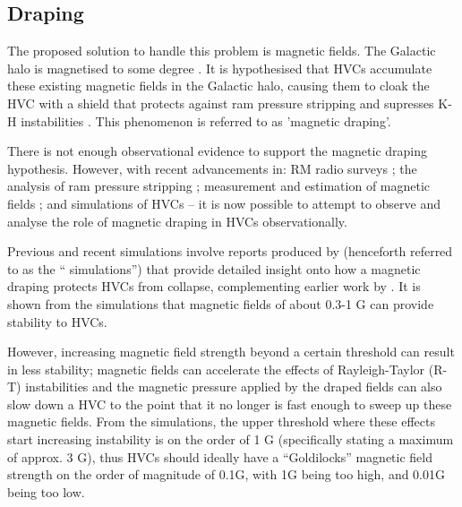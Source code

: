 \subsection{Draping}
\label{ssec:draping}

The proposed solution to handle this problem is magnetic fields. The Galactic halo is magnetised to some degree \citep{ID30, ID16, ID4, ID42}. It is hypothesised that HVCs accumulate these existing magnetic fields in the Galactic halo, causing them to cloak the HVC with a shield that protects against ram pressure stripping and supresses K-H instabilities \citep{ID10, ID11, ID13, ID23, ID24, ID34}. This phenomenon is referred to as 'magnetic draping'.


There is not enough observational evidence to support the magnetic draping hypothesis. However, with recent advancements in: RM radio surveys \citep{ID52, ID71, ID1, ID3, ID6, ID18, ID43, ID44, ID45}; the analysis of ram pressure stripping \citep{ID11, ID23, ID33}; measurement and estimation of magnetic fields \citep{ID5, ID23, ID30, ID11, ID26, ID21}; and simulations of HVCs \citep{ID13, ID23, ID24, ID33, ID34} – it is now possible to attempt to observe and analyse the role of magnetic draping in HVCs observationally.


Previous and recent simulations involve reports produced by \cite{ID23, ID24, ID33} (henceforth referred to as the “\citeauthor{ID23} simulations”) that provide detailed insight onto how a magnetic draping protects HVCs from collapse, complementing earlier work by \cite{ID13, ID11}. It is shown from the \citeauthor{ID23} simulations that magnetic fields of about 0.3-1 {\textmu}G can provide stability to HVCs.


However, increasing magnetic field strength beyond a certain threshold can result in less stability; magnetic fields can accelerate the effects of Rayleigh-Taylor (R-T) instabilities and the magnetic pressure applied by the draped fields can also slow down a HVC to the point that it no longer is fast enough to sweep up these magnetic fields. From the \citeauthor{ID23} simulations, the upper threshold where these effects start increasing instability is on the order of 1 {\textmu}G (specifically stating a maximum of approx. 3 {\textmu}G), thus HVCs should ideally have a “Goldilocks” magnetic field strength on the order of magnitude of 0.1{\textmu}G, with 1{\textmu}G being too high, and 0.01{\textmu}G being too low.


